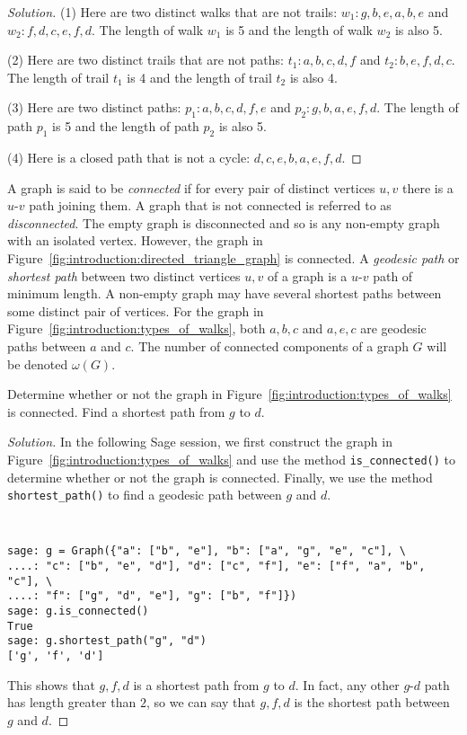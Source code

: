 \begin{proof}[Solution]
(1) Here are two distinct walks that are not trails:
$w_1: g, b, e, a, b, e$ and $w_2: f, d, c, e, f, d$. The length of
walk $w_1$ is 5 and the length of walk $w_2$ is also 5.

(2) Here are two distinct trails that are not paths:
$t_1: a, b, c, d, f$ and $t_2: b, e, f, d, c$. The length of trail
$t_1$ is 4 and the length of trail $t_2$ is also 4.

(3) Here are two distinct paths: $p_1: a, b, c, d, f, e$ and
$p_2: g, b, a, e, f, d$. The length of path $p_1$ is 5 and the length
of path $p_2$ is also 5.

(4) Here is a closed path that is not a cycle: $d, c, e, b, a, e, f, d$.
\end{proof}

A graph is said to be \emph{connected} if for every pair of distinct
vertices $u, v$ there is a $u$-$v$ path joining them. A graph that is
not connected is referred to as \emph{disconnected}. The empty graph
is disconnected and so is any non-empty graph with an isolated
vertex. However, the graph in
Figure~\ref{fig:introduction:directed_triangle_graph} is
connected. A \emph{geodesic path} or \emph{shortest path} between two
distinct vertices $u,v$ of a graph is a $u$-$v$ path of minimum
length. A non-empty graph may have several shortest paths between some
distinct pair of vertices. For the graph in
Figure~\ref{fig:introduction:types_of_walks}, both $a,b,c$ and $a,e,c$
are geodesic paths between $a$ and $c$. The number of connected
components of a graph $G$ will be denoted $\omega(G)$.
\index{$\omega$}

\begin{example}
Determine whether or not the graph in
Figure~\ref{fig:introduction:types_of_walks} is connected. Find a
shortest path from $g$ to $d$.
\end{example}

\begin{proof}[Solution]
In the following Sage session, we first construct the graph in
Figure~\ref{fig:introduction:types_of_walks} and use the method
\verb!is_connected()! to determine whether or not the graph is
connected. Finally, we use the method \verb!shortest_path()! to find
a geodesic path between $g$ and $d$.
%
\begin{center}
\fontsize{9pt}{9pt}
\selectfont
\tt
\begin{lstlisting}
sage: g = Graph({"a": ["b", "e"], "b": ["a", "g", "e", "c"], \
....: "c": ["b", "e", "d"], "d": ["c", "f"], "e": ["f", "a", "b", "c"], \
....: "f": ["g", "d", "e"], "g": ["b", "f"]})
sage: g.is_connected()
True
sage: g.shortest_path("g", "d")
['g', 'f', 'd']
\end{lstlisting}
\end{center}
%
This shows that $g, f, d$ is a shortest path from $g$ to $d$. In fact,
any other $g$-$d$ path has length greater than $2$, so we can say that
$g, f, d$ is the shortest path between $g$ and $d$.
\end{proof}

